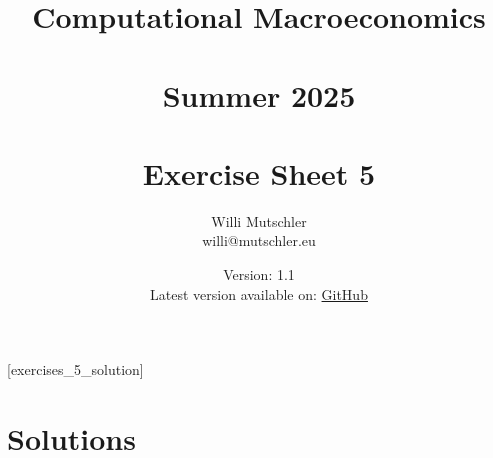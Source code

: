 
\newif\ifDisplaySolutions\DisplaySolutionstrue%


\title{Computational Macroeconomics\\~\\Summer 2025\\~\\Exercise Sheet 5}
\author{Willi Mutschler\\willi@mutschler.eu}
\date{Version: 1.1\\Latest version available on: \href{https://github.com/wmutschl/Computational-Macroeconomics/releases/latest/download/exercises_5.pdf}{GitHub}}
\maketitle\thispagestyle{empty}

\newpage
{}[exercises_5_solution]
\tableofcontents\thispagestyle{empty}\newpage

\setcounter{page}{1}
\newpage
\newpage
\newpage

\newpage

\ifDisplaySolutions%
\newpage
\appendix
\section{Solutions}

\fi
